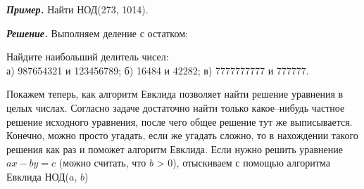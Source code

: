 \noindent \textbf{\textit{Пример.}} Найти НОД(273, 1014).

\textit{\textbf{Решение.}} Выполняем деление с остатком:


\begin{ex}
    Найдите наибольший делитель чисел:
    \\
    а) 987654321 и 123456789; \hfill б) 16484 и 42282; \hfill в) 7777777777 и 777777.
\end{ex}

Покажем теперь, как алгоритм Евклида позволяет найти решение уравнения в целых числах. Согласно задаче \label{11.2 thm1} достаточно найти только какое--нибудь частное решение исходного уравнения, после чего общее решение тут же выписывается. Конечно, можно просто угадать, если же угадать сложно, то в нахождении такого решения как раз и поможет алгоритм Евклида. Если нужно решить уравнение $ax - by = c$ (можно считать, что $b$ > 0), отыскиваем с помощью алгоритма Евклида НОД($a$, $b$)


